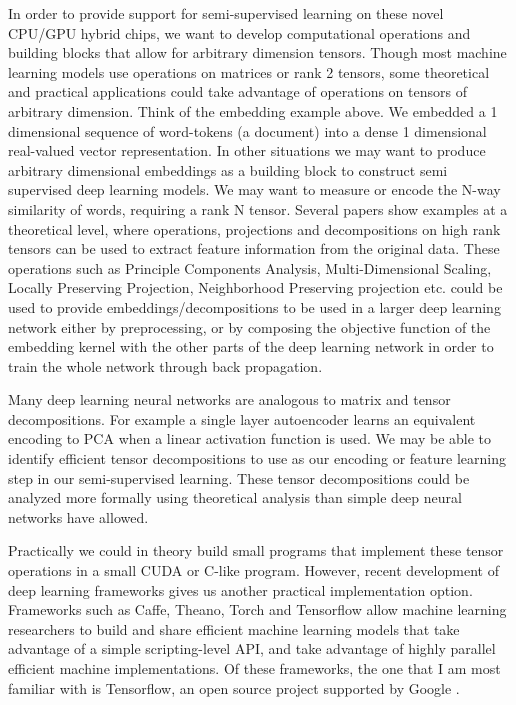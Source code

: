 In order to provide support for semi-supervised learning on these novel CPU/GPU hybrid chips, we want to develop computational operations and building blocks that allow for arbitrary dimension tensors. Though most machine learning models use operations on matrices or rank 2 tensors, some theoretical and practical applications could take advantage of operations on tensors of arbitrary dimension. Think of the embedding example above. We embedded a 1 dimensional sequence of word-tokens (a document) into a dense 1 dimensional real-valued vector representation. In other situations we may want to produce arbitrary dimensional embeddings as a building block to construct semi supervised deep learning models. We may want to measure or encode the N-way similarity of words, requiring a rank N tensor. Several papers show examples at a theoretical level, where operations, projections and decompositions on high rank tensors can be used to extract feature information from the original data\cite{cichocki2016low, cichocki2014tensor}. These operations such as Principle Components Analysis, Multi-Dimensional Scaling, Locally Preserving Projection, Neighborhood Preserving projection etc. could be used to provide embeddings/decompositions to be used in a larger deep learning network either by preprocessing, or by composing the objective function of the embedding kernel with the other parts of the deep learning network in order to train the whole network through back propagation.

Many deep learning neural networks are analogous to matrix and tensor decompositions. For example a single layer autoencoder learns an equivalent encoding to PCA when a linear activation function is used\cite{hinton2006reducing}. We may be able to identify efficient tensor decompositions to use as our encoding or feature learning step in our semi-supervised learning. These tensor decompositions could be analyzed more formally using theoretical analysis than simple deep neural networks have allowed.

Practically we could in theory build small programs that implement these tensor operations in a small CUDA or C-like program. However, recent development of deep learning frameworks gives us another practical implementation option. Frameworks such as Caffe, Theano, Torch and Tensorflow allow machine learning researchers to build and share efficient machine learning models that take advantage of a simple scripting-level API, and take advantage of highly parallel efficient machine implementations. Of these frameworks, the one that I am most familiar with is Tensorflow, an open source project supported by Google \cite{abadi2016tensorflow}. 

